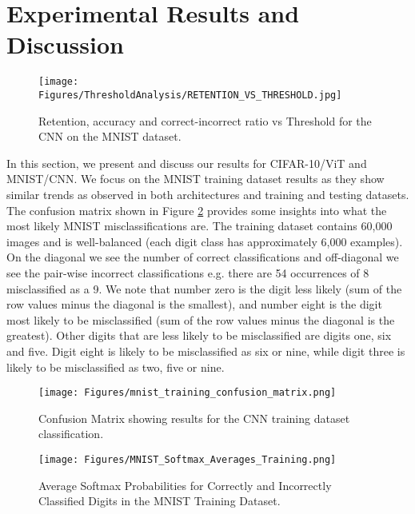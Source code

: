 
\section{Experimental Results and Discussion}

\begin{figure}[ht]
    \centering
    \texttt{[image: Figures/ThresholdAnalysis/RETENTION\_VS\_THRESHOLD.jpg]}
    \caption{Retention, accuracy and correct-incorrect ratio vs Threshold for the CNN on the MNIST dataset.     
    }
\label{fig:MNIST_TRAINING_DATASET_ACC_RATIO_VS_THRESHOLD}
\end{figure}

In this section, we present and discuss our results for CIFAR-10/ViT and MNIST/CNN. We focus on the MNIST training dataset results as they show similar trends as observed in both architectures and training and testing datasets. The confusion matrix shown in Figure \ref{fig:mnist_training_confusion_matrix} provides some insights into what the most likely MNIST misclassifications are. The training dataset contains 60,000 images and is well-balanced (each digit class has approximately 6,000 examples). On the diagonal we see the number of correct classifications and off-diagonal we see the pair-wise incorrect classifications e.g. there are 54 occurrences of 8 misclassified as a 9. We note that number zero is the digit less likely (sum of the row values minus the diagonal is the smallest), and number eight is the digit most likely to be misclassified  (sum of the row values minus the diagonal is the greatest). Other digits that are less likely to be misclassified are digits one, six and five. Digit eight is likely to be misclassified as six or nine, while digit three is likely to be misclassified as two, five or nine.

\begin{figure}[ht]
    \centering
    \texttt{[image: Figures/mnist\_training\_confusion\_matrix.png]}
    \caption{Confusion Matrix showing results for the CNN training dataset classification.     %
    }
\label{fig:mnist_training_confusion_matrix}
\end{figure}

\begin{figure*}[ht]
    \centering
    \texttt{[image: Figures/MNIST\_Softmax\_Averages\_Training.png]}
    \caption{Average Softmax Probabilities for Correctly and Incorrectly Classified Digits in the MNIST Training Dataset.}
    \label{fig:MNIST_Softmax_Averages_Training}
\end{figure*}

